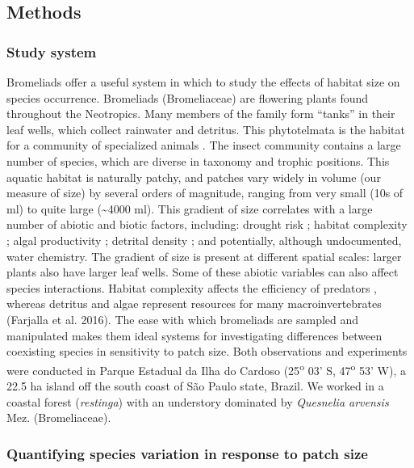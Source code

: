 \subsection{Methods}\label{methods}

\subsubsection{Study system}\label{study-system}

Bromeliads offer a useful system in which to study the effects of
habitat size on species occurrence. Bromeliads (Bromeliaceae) are
flowering plants found throughout the Neotropics. Many members of the
family form ``tanks'' in their leaf wells, which collect rainwater and
detritus. This phytotelmata is the habitat for a community of
specialized animals \citep{Frank2009, Benzing2000}. The insect community
contains a large number of species, which are diverse in taxonomy and
trophic positions. This aquatic habitat is naturally patchy, and patches
vary widely in volume (our measure of size) by several orders of
magnitude, ranging from very small (10s of ml) to quite large
(\textasciitilde{}4000 ml). This gradient of size correlates with a
large number of abiotic and biotic factors, including: drought risk
\citep{Amundrud2015}; habitat complexity \citep{Srivastava2006a}; algal
productivity \citep{Marino2011}; detrital density
\citep{Richardson1999}; and potentially, although undocumented, water
chemistry. The gradient of size is present at different spatial scales:
larger plants also have larger leaf wells. Some of these abiotic
variables can also affect species interactions. Habitat complexity
affects the efficiency of predators \citep{Srivastava2006a}, whereas
detritus and algae represent resources for many macroinvertebrates
(Farjalla et al. 2016). The ease with which bromeliads are sampled and
manipulated makes them ideal systems for investigating differences
between coexisting species in sensitivity to patch size. Both
observations and experiments were conducted in Parque Estadual da Ilha
do Cardoso (25\textsuperscript{o} 03' S, 47\textsuperscript{o} 53' W), a
22.5 ha island off the south coast of São Paulo state, Brazil. We worked
in a coastal forest (\emph{restinga}) with an understory dominated by
\emph{Quesnelia arvensis} Mez. (Bromeliaceae).

\subsubsection{Quantifying species variation in response to patch
size}\label{quantifying-species-variation-in-response-to-patch-size}

